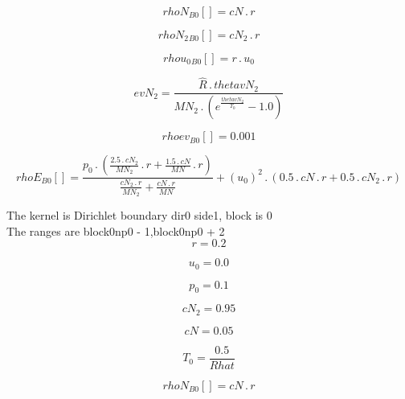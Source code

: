 \documentclass{article}
\begin{document}
\begin{dmath}{rhoN{_{B0}}}[{}] = cN \,.\, r\end{dmath}

\begin{dmath}{rhoN_{2}{_{B0}}}[{}] = cN_{2} \,.\, r\end{dmath}

\begin{dmath}{rhou_{0}{_{B0}}}[{}] = r \,.\, u_{0}\end{dmath}

\begin{dmath}evN_{2} = \frac{\hat{R} \,.\, thetavN_{2}}{MN_{2} \,.\, \left(e^{\frac{thetavN_{2}}{T_{0}}} - 1.0\right)}\end{dmath}

\begin{dmath}{rhoev{_{B0}}}[{}] = 0.001\end{dmath}

\begin{dmath}{rhoE{_{B0}}}[{}] = \frac{p_{0} \,.\, \left(\frac{2.5 \,.\, cN_{2}}{MN_{2}} \,.\, r + \frac{1.5 \,.\, cN}{MN} \,.\, r\right)}{\frac{cN_{2} \,.\, r}{MN_{2}} + \frac{cN \,.\, r}{MN}} + \left(u_{0} \right)^{2} \,.\, \left(0.5 \,.\, cN \,.\, 
r + 0.5 \,.\, cN_{2} \,.\, r\right)\end{dmath}

\noindent The kernel is Dirichlet boundary dir0 side1, block is 0\\\noindent The ranges are block0np0 - 1,block0np0 + 2\\\begin{dmath}r = 0.2\end{dmath}

\begin{dmath}u_{0} = 0.0\end{dmath}

\begin{dmath}p_{0} = 0.1\end{dmath}

\begin{dmath}cN_{2} = 0.95\end{dmath}

\begin{dmath}cN = 0.05\end{dmath}

\begin{dmath}T_{0} = \frac{0.5}{Rhat}\end{dmath}

\begin{dmath}{rhoN{_{B0}}}[{}] = cN \,.\, r\end{dmath}
\end{document}
